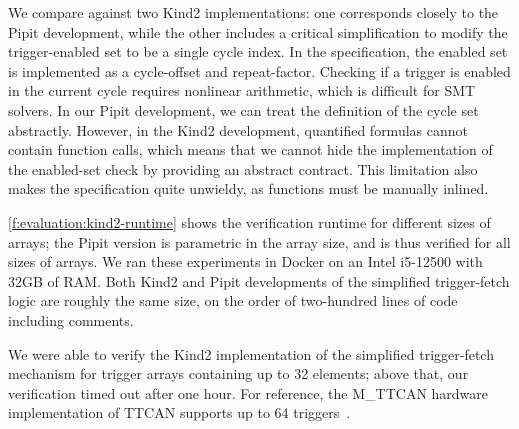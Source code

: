 We compare against two Kind2 implementations: one corresponds closely to the Pipit development, while the other includes a critical simplification to modify the trigger-enabled set to be a single cycle index.
In the specification, the enabled set is implemented as a cycle-offset and repeat-factor.
Checking if a trigger is enabled in the current cycle requires nonlinear arithmetic, which is difficult for SMT solvers.
In our Pipit development, we can treat the definition of the cycle set abstractly.
However, in the Kind2 development, quantified formulas cannot contain function calls, which means that we cannot hide the implementation of the enabled-set check by providing an abstract contract.
This limitation also makes the specification quite unwieldy, as functions must be manually inlined.


\autoref{f:evaluation:kind2-runtime} shows the verification runtime for different sizes of arrays; the Pipit version is parametric in the array size, and is thus verified for all sizes of arrays.
We ran these experiments in Docker on an Intel i5-12500 with 32GB of RAM.
Both Kind2 and Pipit developments of the simplified trigger-fetch logic are roughly the same size, on the order of two-hundred lines of code including comments.

We were able to verify the Kind2 implementation of the simplified trigger-fetch mechanism for trigger arrays containing up to 32 elements; above that, our verification timed out after one hour.
For reference, the M_TTCAN hardware implementation of TTCAN supports up to 64 triggers~\cite{bosch2019mttcan}.


